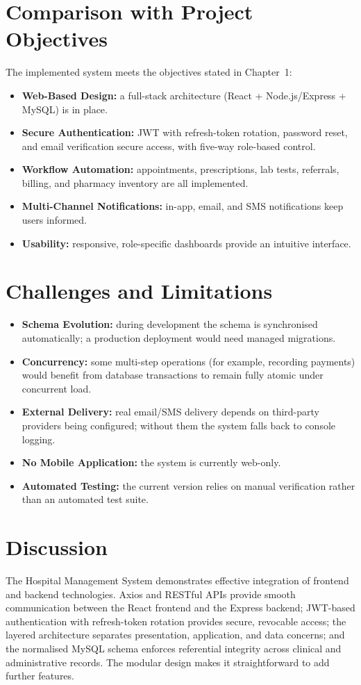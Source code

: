 \documentclass[12pt,a4paper]{report}
\begin{document}
\section{Comparison with Project Objectives}
The implemented system meets the objectives stated in Chapter~1:
\begin{itemize}[leftmargin=1.4em]
  \item \textbf{Web-Based Design:} a full-stack architecture (React + Node.js/Express +
        MySQL) is in place.
  \item \textbf{Secure Authentication:} JWT with refresh-token rotation, password reset,
        and email verification secure access, with five-way role-based control.
  \item \textbf{Workflow Automation:} appointments, prescriptions, lab tests, referrals,
        billing, and pharmacy inventory are all implemented.
  \item \textbf{Multi-Channel Notifications:} in-app, email, and SMS notifications keep
        users informed.
  \item \textbf{Usability:} responsive, role-specific dashboards provide an intuitive
        interface.
\end{itemize}

\section{Challenges and Limitations}
\begin{itemize}[leftmargin=1.4em]
  \item \textbf{Schema Evolution:} during development the schema is synchronised
        automatically; a production deployment would need managed migrations.
  \item \textbf{Concurrency:} some multi-step operations (for example, recording
        payments) would benefit from database transactions to remain fully atomic under
        concurrent load.
  \item \textbf{External Delivery:} real email/SMS delivery depends on third-party
        providers being configured; without them the system falls back to console
        logging.
  \item \textbf{No Mobile Application:} the system is currently web-only.
  \item \textbf{Automated Testing:} the current version relies on manual verification
        rather than an automated test suite.
\end{itemize}

\section{Discussion}
The Hospital Management System demonstrates effective integration of frontend and
backend technologies. Axios and RESTful APIs provide smooth communication between the
React frontend and the Express backend; JWT-based authentication with refresh-token
rotation provides secure, revocable access; the layered architecture separates
presentation, application, and data concerns; and the normalised MySQL schema enforces
referential integrity across clinical and administrative records. The modular design
makes it straightforward to add further features.
\end{document}

